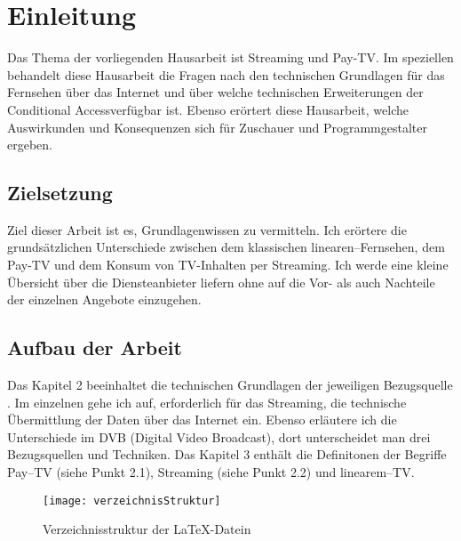\section{Einleitung}
Das Thema der vorliegenden Hausarbeit ist \grqq Streaming und Pay-TV\grqq.
Im speziellen behandelt diese Hausarbeit die Fragen nach den technischen Grundlagen für das Fernsehen über das Internet und über welche technischen Erweiterungen der \grqq Conditional Access\grqq  verfügbar ist.
Ebenso erörtert diese Hausarbeit, welche Auswirkunden und Konsequenzen sich für Zuschauer und Programmgestalter ergeben.

\subsection{Zielsetzung}
Ziel dieser Arbeit ist es, Grundlagenwissen zu vermitteln. Ich erörtere die grundsätzlichen Unterschiede zwischen dem klassischen \grqq linearen\grqq--Fernsehen, dem Pay-TV und dem Konsum von TV-Inhalten per Streaming.
Ich werde eine kleine Übersicht über die Diensteanbieter liefern ohne auf die Vor- als auch Nachteile der einzelnen Angebote einzugehen.


\subsection{Aufbau der Arbeit}
Das Kapitel 2 beeinhaltet die technischen Grundlagen der jeweiligen \grqq Bezugsquelle \grqq. Im einzelnen gehe ich auf, erforderlich für das Streaming, die technische Übermittlung der Daten über das Internet ein. Ebenso erläutere ich die Unterschiede im DVB (Digital Video Broadcast), dort unterscheidet man drei Bezugsquellen und Techniken.
Das Kapitel 3 enthält die Definitonen der Begriffe Pay--TV (siehe Punkt 2.1), Streaming (siehe Punkt 2.2) und \grqq linearem\grqq--TV.




\begin{figure}[H]
\begin{center}
\texttt{[image: verzeichnisStruktur]}
\caption{Verzeichnisstruktur der \LaTeX{}-Datein}
\end{center}
\end{figure}
